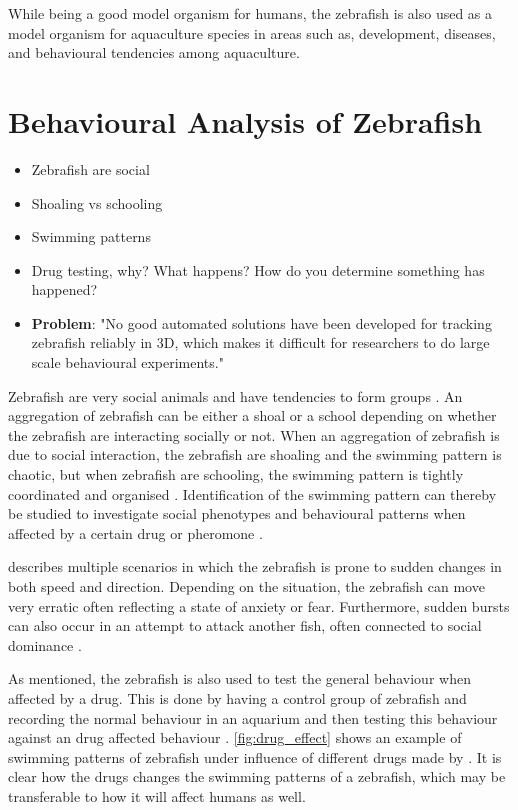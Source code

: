 While being a good model organism for humans, the zebrafish is also used as a model organism for aquaculture species in areas such as, development, diseases, and behavioural tendencies among aquaculture.\\ 


\section{Behavioural Analysis of Zebrafish}

\begin{itemize}
	\item Zebrafish are social
	\item Shoaling vs schooling
	\item Swimming patterns
	\item Drug testing, why? What happens? How do you determine something has happened?
	\item \textbf{Problem}: "No good automated solutions have been developed for tracking zebrafish reliably in 3D, which makes it difficult for researchers to do large scale behavioural experiments."
\end{itemize}

Zebrafish are very social animals and have tendencies to form groups \citep{RahmanKhan2018}. An aggregation of zebrafish can be either a shoal or a school depending on whether the zebrafish are interacting socially or not. When an aggregation of zebrafish is due to social interaction, the zebrafish are shoaling and the swimming pattern is chaotic, but when zebrafish are schooling, the swimming pattern is tightly coordinated and organised \citep{Miller2012a}. Identification of the swimming pattern can thereby be studied to investigate social phenotypes and behavioural patterns when affected by a certain drug or pheromone \citep{RahmanKhan2018}. 

\cite{Kalueff2013} describes multiple scenarios in which the zebrafish is prone to sudden changes in both speed and direction. Depending on the situation, the zebrafish can move very erratic often reflecting a state of anxiety or fear. Furthermore, sudden bursts can also occur in an attempt to attack another fish, often connected to social dominance \citep{Kalueff2013}.

As mentioned, the zebrafish is also used to test the general behaviour when affected by a drug. This is done by having a control group of zebrafish and recording the normal behaviour in an aquarium and then testing this behaviour against an drug affected behaviour \citep{Stewart2015}. \autoref{fig:drug_effect} shows an example of swimming patterns of zebrafish under influence of different drugs made by \cite{Stewart2015}. It is clear how the drugs changes the swimming patterns of a zebrafish, which may be transferable to how it will affect humans as well.\\ 

